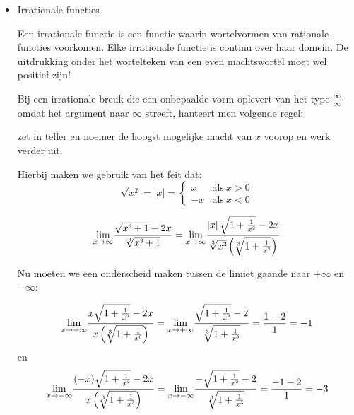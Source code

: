 \begin{itemize}
\begin{voorbeeld}
\end{voorbeeld}




\item{Irrationale functies}

Een irrationale functie is een functie waarin wortelvormen van rationale
functies voorkomen. Elke irrationale functie is continu over haar
domein. De uitdrukking onder het wortelteken van een even machtswortel
moet wel positief zijn!

Bij een irrationale breuk die een onbepaalde vorm oplevert
van het type $\frac{\infty}{\infty}$ omdat het argument naar $\infty$
streeft, hanteert men volgende regel:

zet in teller en noemer de hoogst mogelijke macht van $x$ voorop
en werk verder uit.

Hierbij maken we gebruik van het feit dat: 
\begin{equation*}
\sqrt{x^{2}}=\left|x\right|=\begin{cases}
x & \mathrm{als}\:x>0\\
-x & \mathrm{als}\:x<0
\end{cases}
\end{equation*}


\begin{voorbeeld}
	\begin{equation*}
	{\displaystyle {\displaystyle \lim_{x\to\infty}}\frac{\sqrt{x\text{\texttwosuperior}+1}-2x}{\sqrt[3]{x\text{\textthreesuperior}+1}}={\displaystyle \lim_{x\to\infty}}\frac{\left|x\right|\sqrt{1+\frac{1}{x\text{\texttwosuperior}}}-2x}{\sqrt[3]{x\text{\textthreesuperior}}\left(\sqrt[3]{1+\frac{1}{x\text{\textthreesuperior}}}\right)}}
	\end{equation*}

Nu moeten we een onderscheid maken tussen de limiet gaande naar $+\infty$
en $-\infty$:

\begin{equation*}
	{\displaystyle {\displaystyle \lim_{x\to+\infty}}\frac{x\sqrt{1+\frac{1}{x\text{\texttwosuperior}}}-2x}{x\left(\sqrt[3]{1+\frac{1}{x\text{\textthreesuperior}}}\right)}={\displaystyle \lim_{x\to+\infty}}\frac{\sqrt{1+\frac{1}{x\text{\texttwosuperior}}}-2}{\sqrt[3]{1+\frac{1}{x\text{\textthreesuperior}}}}=\frac{1-2}{1}=-1}
\end{equation*}
	en
	\begin{equation*}
{\displaystyle {\displaystyle \lim_{x\to-\infty}}\frac{(-x)\sqrt{1+\frac{1}{x\text{\texttwosuperior}}}-2x}{x\left(\sqrt[3]{1+\frac{1}{x\text{\textthreesuperior}}}\right)}={\displaystyle \lim_{x\to-\infty}}\frac{-\sqrt{1+\frac{1}{x\text{\texttwosuperior}}}-2}{\sqrt[3]{1+\frac{1}{x\text{\textthreesuperior}}}}=\frac{-1-2}{1}=-3}
\end{equation*}


\end{voorbeeld}
\end{itemize}
